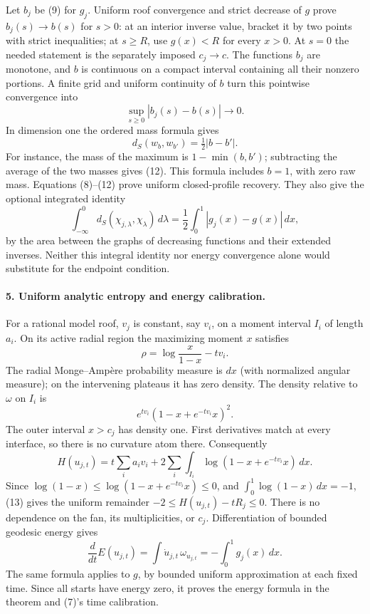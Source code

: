 \documentclass[11pt]{article}
\begin{document}
Let $b_j$ be (9) for $g_j$. Uniform roof convergence and strict
decrease of $g$ prove $b_j(s)\to b(s)$ for $s>0$: at an interior
inverse value, bracket it by two points with strict inequalities;
at $s\ge R$, use $g(x)<R$ for every $x>0$.
At $s=0$ the needed statement is the separately imposed
$c_j\to c$. The functions $b_j$ are monotone, and $b$ is continuous
on a compact interval containing all their nonzero portions.
A finite grid and uniform continuity of $b$ turn this pointwise
convergence into
\[
 \sup_{s\ge0}|b_j(s)-b(s)|\longrightarrow0.              \tag{11}
\]
In dimension one the ordered mass formula gives
\[
 d_S(w_b,w_{b'})=\tfrac12|b-b'|.                         \tag{12}
\]
For instance, the mass of the maximum is $1-\min(b,b')$;
subtracting the average of the two masses gives (12).
This formula includes $b=1$, with zero raw mass.
Equations (8)--(12) prove uniform closed-profile recovery.
They also give the optional integrated identity
\[
 \int_{-\infty}^0 d_S(\chi_{j,\lambda},\chi_\lambda)\,d\lambda
 =\frac12\int_0^1|g_j(x)-g(x)|\,dx,
\]
by the area between the graphs of decreasing functions and their
extended inverses. Neither this integral identity nor energy
convergence alone would substitute for the endpoint condition.

\paragraph{5. Uniform analytic entropy and energy calibration.}
For a rational model roof, $v_j$ is constant, say $v_i$, on a
moment interval $I_i$ of length $a_i$. On its active radial region
the maximizing moment $x$ satisfies
\[
 \rho=\log\frac{x}{1-x}-t v_i.
\]
The radial Monge--Amp\`ere probability measure is $dx$ (with normalized
angular measure); on the intervening plateaus it has zero density.
The density relative to $\omega$ on $I_i$ is
\[
 e^{t v_i}(1-x+e^{-t v_i}x)^2.
\]
The outer interval $x>c_j$ has density one. First derivatives
match at every interface, so there is no curvature atom there.
Consequently
\[
 H(u_{j,t})=t\sum_i a_i v_i
    +2\sum_i\int_{I_i}\log(1-x+e^{-t v_i}x)\,dx.          \tag{13}
\]
Since $\log(1-x)\le\log(1-x+e^{-t v_i}x)\le0$,
and $\int_0^1\log(1-x)\,dx=-1$, (13) gives the uniform
remainder $-2\le H(u_{j,t})-tR_j\le0$.
There is no dependence on the fan, its multiplicities, or $c_j$.
Differentiation of bounded geodesic energy gives
\[
 \frac{d}{dt}E(u_{j,t})=
 \int\dot u_{j,t}\,\omega_{u_{j,t}}=-\int_0^1g_j(x)\,dx.
\]
The same formula applies to $g$, by bounded uniform approximation
at each fixed time. Since all starts have energy zero, it proves
the energy formula in the theorem and (7)'s time calibration.
\end{document}
